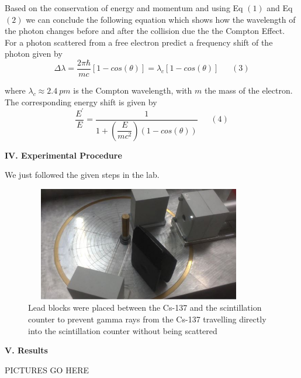 \documentclass[fleqn]{article}
\begin{document}
  \vspace{15px}

  Based on the conservation of energy and momentum and using Eq $(1)$ and Eq $(2)$ we can conclude the following equation which shows
  how the wavelength of the photon changes before and after the collision due the the Compton Effect. For a photon scattered from
  a free electron predict a frequency shift of the photon given by
  $$\Delta \lambda=\dfrac{2 \pi \hbar}{mc} \left[1-cos(\theta)\right]=\lambda_c \left[1-cos(\theta)\right]  ~~~~~~~ (3)$$

  where $\lambda_c \approx 2.4 ~ pm$ is the Compton wavelength, with $m$ the mass of the electron. The corresponding energy shift is given by
  $$\dfrac{E^'}{E}=\dfrac{1}{1+\left(\dfrac{E}{mc^2}\right)\left(1-cos (\theta)\right)} ~~~~~~~ (4)$$

  \vspace{10px}

  \textbf{IV. Experimental Procedure}

  \vspace{10px}

  We just followed the given steps in the lab.


  \begin{figure}[htbp]
    \includegraphics[height=5cm, width=10cm]{Two.JPG}
    \caption{
      Lead blocks were placed between the Cs-137 and the scintillation counter to prevent gamma rays from the
      Cs-137 travelling directly into the scintillation counter without being scattered
    }
  \end{figure}


  \textbf{V. Results}

  PICTURES GO HERE
\end{document}
